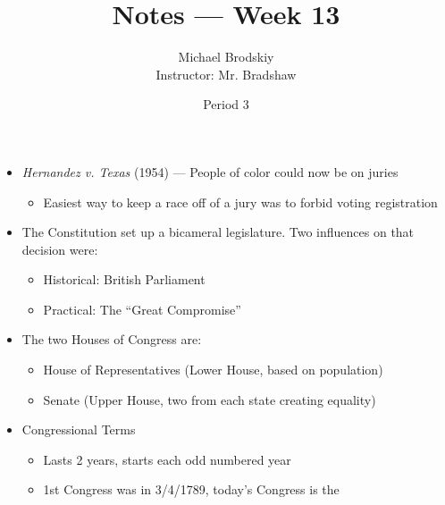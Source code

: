 \documentclass[12pt]{article}
\title{Notes — Week 13}
\date{Period 3}
\author{Michael Brodskiy\\ \small Instructor: Mr. Bradshaw}
\begin{document}
\maketitle

\begin{itemize}

  \item \textit{Hernandez v. Texas} (1954) — People of color could now be on juries

    \begin{itemize}

      \item Easiest way to keep a race off of a jury was to forbid voting registration

    \end{itemize}

  \item The Constitution set up a bicameral legislature. Two influences on that decision were:

    \begin{itemize}

      \item Historical: British Parliament

      \item Practical: The “Great Compromise”

    \end{itemize}

  \item The two Houses of Congress are:

    \begin{itemize}

      \item House of Representatives (Lower House, based on population)

      \item Senate (Upper House, two from each state creating equality)

    \end{itemize}

  \item Congressional Terms

    \begin{itemize}

      \item Lasts 2 years, starts each odd numbered year

      \item 1st Congress was in 3/4/1789, today's Congress is the 


\end{itemize}
\end{itemize}
\end{document}
